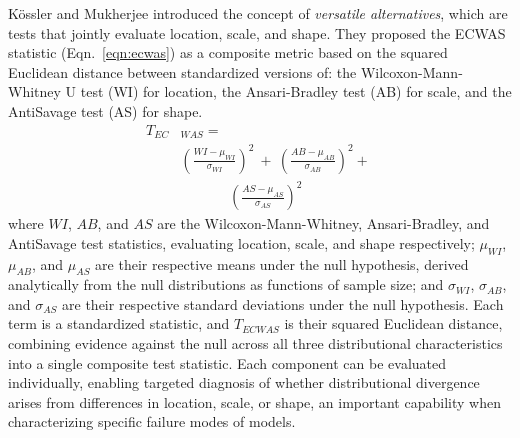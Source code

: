 K\"{o}ssler and Mukherjee \cite{Kossler2019} introduced the concept of \textit{versatile alternatives}, which are tests that jointly evaluate location, scale, and shape. They proposed the ECWAS statistic (Eqn.~\ref{eqn:ecwas}) as a composite metric based on the squared Euclidean distance between standardized versions of: the Wilcoxon-Mann-Whitney U test (WI) for location, the Ansari-Bradley test (AB) for scale, and the AntiSavage test (AS) for shape.
\begin{equation}\label{eqn:ecwas}
    \begin{aligned}
        T_{EC}& _{WAS} = \\&\left(\frac{WI-\mu_{WI}}{\sigma_{WI}}\right)^2\ +\ \left(\frac{AB-\mu_{AB}}{\sigma_{AB}}\right)^2+\ \\[0pt] 
        &\phantom{\left(\frac{WI-\mu.}{\sigma}\right.}\left(\frac{AS-\mu_{AS}}{\sigma_{AS}}\right)^2
    \end{aligned}
\end{equation}
\noindent where $WI$, $AB$, and $AS$ are the Wilcoxon-Mann-Whitney, Ansari-Bradley, and AntiSavage test statistics, evaluating location, scale, and shape respectively; $\mu_{WI}$, $\mu_{AB}$, and $\mu_{AS}$ are their respective means under the null hypothesis, derived analytically from the null distributions as functions of sample size; and $\sigma_{WI}$, $\sigma_{AB}$, and $\sigma_{AS}$ are their respective standard deviations under the null hypothesis. Each term is a standardized statistic, and $T_{ECWAS}$ is their squared Euclidean distance, combining evidence against the null across all three distributional characteristics into a single composite test statistic. Each component can be evaluated individually, enabling targeted diagnosis of whether distributional divergence arises from differences in location, scale, or shape, an important capability when characterizing specific failure modes of \DL models.

